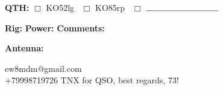 \documentclass{article}
\begin{document}
\vfill

\footnotesize \textbf{QTH:}
     $\Box$  KO52lg \,
     $\Box$  KO85rp \,
         $\Box$  $\rule{3cm}{0.15mm}$
\vfill

\footnotesize \textbf{Rig:} \makebox[0.3\textwidth]{} \textbf{Power:} \makebox[0.1\textwidth]{} \textbf{Comments:}

\vfill

\textbf{Antenna:} \makebox[1cm]{}

\vfill
        ew8mdm@gmail.com
        \\
        +79998719726
\hfill TNX for QSO, best regards, 73!
\end{document}
